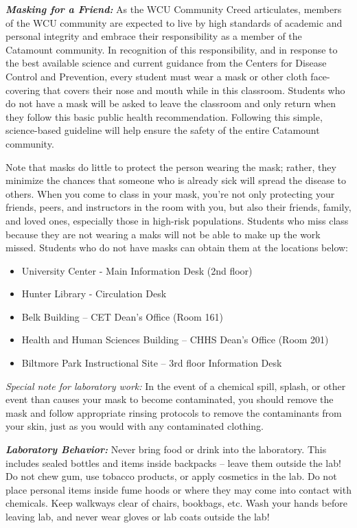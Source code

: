 \documentclass[]{tufte-book}
\providecommand{\tightlist}{%
  \setlength{\itemsep}{0pt}\setlength{\parskip}{0pt}}
\begin{document}
\textbf{\emph{Masking for a Friend:}} As the WCU Community Creed articulates, members of the WCU community are expected to live by high standards of academic and personal integrity and embrace their responsibility as a member of the Catamount community. In recognition of this responsibility, and in response to the best available science and current guidance from the Centers for Disease Control and Prevention, every student must wear a mask or other cloth face-covering that covers their nose and mouth while in this classroom. Students who do not have a mask will be asked to leave the classroom and only return when they follow this basic public health recommendation. Following this simple, science-based guideline will help ensure the safety of the entire Catamount community.

Note that masks do little to protect the person wearing the mask; rather, they minimize the chances that someone who is already sick will spread the disease to others. When you come to class in your mask, you're not only protecting your friends, peers, and instructors in the room with you, but also their friends, family, and loved ones, especially those in high-risk populations. Students who miss class because they are not wearing a maks will not be able to make up the work missed. Students who do not have masks can obtain them at the locations below:

\begin{itemize}
\tightlist
\item
  University Center - Main Information Desk (2nd floor)
\item
  Hunter Library - Circulation Desk
\item
  Belk Building -- CET Dean's Office (Room 161)
\item
  Health and Human Sciences Building -- CHHS Dean's Office (Room 201)
\item
  Biltmore Park Instructional Site -- 3rd floor Information Desk
\end{itemize}

\emph{Special note for laboratory work:} In the event of a chemical spill, splash, or other event than causes your mask to become contaminated, you should remove the mask and follow appropriate rinsing protocols to remove the contaminants from your skin, just as you would with any contaminated clothing.

\textbf{\emph{Laboratory Behavior:}} Never bring food or drink into the laboratory. This includes sealed bottles and items inside backpacks -- leave them outside the lab! Do not chew gum, use tobacco products, or apply cosmetics in the lab. Do not place personal items inside fume hoods or where they may come into contact with chemicals. Keep walkways clear of chairs, bookbags, etc. Wash your hands before leaving lab, and never wear gloves or lab coats outside the lab!
\end{document}
